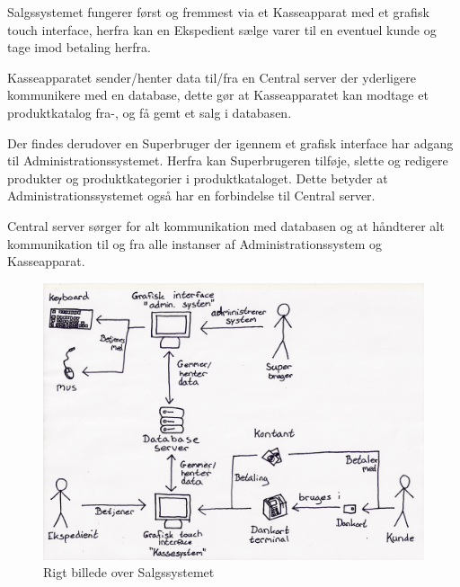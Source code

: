 Salgssystemet fungerer først og fremmest via et Kasseapparat med et grafisk touch interface, herfra kan en Ekspedient sælge varer til en eventuel kunde og tage imod betaling herfra. 

Kasseapparatet sender/henter data til/fra en Central server der yderligere kommunikere med en database, dette gør at Kasseapparatet kan modtage et produktkatalog fra-, og få gemt et salg i databasen. 

Der findes derudover en Superbruger der igennem et grafisk interface har adgang til Administrationssystemet. Herfra kan Superbrugeren tilføje, slette og redigere produkter og produktkategorier i produktkataloget. Dette betyder at Administrationssystemet også har en forbindelse til Central server.

Central server sørger for alt kommunikation med databasen og at håndterer alt kommunikation til og fra alle instanser af Administrationssystem og Kasseapparat.


\begin{figure}[!h]
    \centering
    \includegraphics[width=1.0\textwidth]{Systembeskrivelse/RigtBillede2.jpg}
    \caption{Rigt billede over Salgssystemet}
    \label{fig:Rigtbill}
\end{figure}


